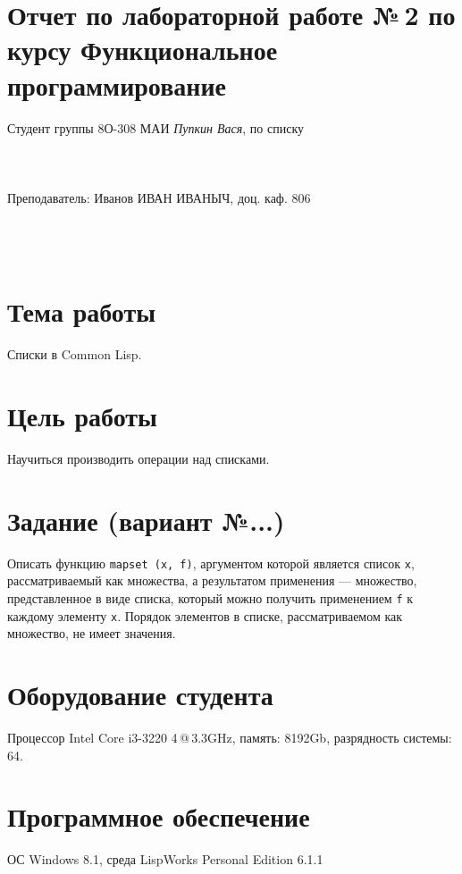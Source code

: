 \documentclass[12pt]{article}
\begin{document}
\section*{Отчет по лабораторной работе №\,2 
по курсу \guillemotleft  Функциональное программирование\guillemotright}
\begin{flushright}
Студент группы 8О-308 МАИ \textit{Пупкин Вася},  по списку \\
 \\
 \\
\ \\
Преподаватель: Иванов ИВАН ИВАНЫЧ, доц. каф. 806 \\
 \\
 \\
 \\

\end{flushright}

\section{Тема работы}
Списки в Common Lisp.

\section{Цель работы}
Научиться производить операции над списками.

\section{Задание (вариант №...)}
Описать функцию {\tt mapset (x, f)}, аргументом которой является список {\tt x}, рассматриваемый как множества, а результатом применения --- множество, представленное в виде списка, который можно получить применением {\tt f} к каждому элементу {\tt x}. Порядок элементов в списке, рассматриваемом как множество, не имеет значения.

\section{Оборудование студента}
Процессор Intel Core i3-3220 4\,@\,3.3GHz, память: 8192Gb, разрядность системы: 64.

\section{Программное обеспечение}
ОС Windows 8.1, среда LispWorks Personal Edition 6.1.1
\end{document}
